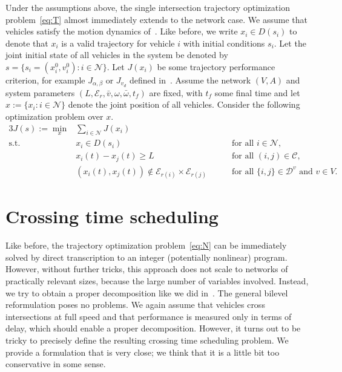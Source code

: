 \documentclass{report}
\theoremstyle{definition}
\theoremstyle{plain}
\begin{document}
Under the assumptions above, the single intersection trajectory
optimization problem~\eqref{eq:T} almost immediately extends to the network case.
%
We assume that vehicles satisfy the motion dynamics of~.
%
Like before, we write $x_i \in D(s_i)$ to denote that $x_i$ is a valid
trajectory for vehicle $i$ with initial conditions $s_i$.
%
Let the joint initial state of all vehicles in the system be denoted by
$s = \{ s_i = (x_i^0, v_i^0) : i \in \mathcal{N} \}$.
%
Let $J(x_i)$ be some trajectory performance criterion, for example
$J_{\alpha,\beta}$ or $J_{v_d}$ defined in~.
%
Assume the network $(V,A)$ and system parameters
$(L, \mathcal{E}_r, \bar{v}, \omega, \bar{\omega}, t_f)$ are fixed, with $t_f$ some final
time and let $x := \{ x_i : i \in \mathcal{N} \}$ denote the joint position of all
vehicles. Consider the following optimization problem over $x$.
%
\begin{alignat}{3}\label{eq:N}
  J(s) := \min_x & \sum_{i \in \mathcal{N}} J(x_i) \tag{NT} \\
      \text{s.t. }&  x_i \in D(s_i) && \quad \text{ for all } i \in \mathcal{N} , \tag{NT.1} \\
                       &  x_i(t) - x_j(t) \geq L && \quad \text{ for all } (i,j) \in \mathcal{C} , \tag{NT.2} \\
                       &  (x_i(t), x_j(t)) \notin \mathcal{E}_{r(i)} \times \mathcal{E}_{r(j)} && \quad \text{ for all } \{i,j\} \in \mathcal{D}^v \text{ and  } v \in V . \tag{NT.3}
\end{alignat}

\section{Crossing time scheduling}

Like before, the trajectory optimization problem~\eqref{eq:N} can be immediately
solved by direct transcription to an integer (potentially nonlinear) program.
%
However, without further tricks, this approach does not scale to networks of
practically relevant sizes, because the large number of variables involved.
%
Instead, we try to obtain a proper decomposition like we did
in~.
%
The general bilevel reformulation poses no problems. We again assume that
vehicles cross intersections at full speed and that performance is measured only
in terms of delay, which should enable a proper decomposition.
%
However, it turns out to be tricky to precisely define the resulting crossing
time scheduling problem.
%
We provide a formulation that is very close; we think that it is a little bit
too conservative in some sense.
\end{document}
